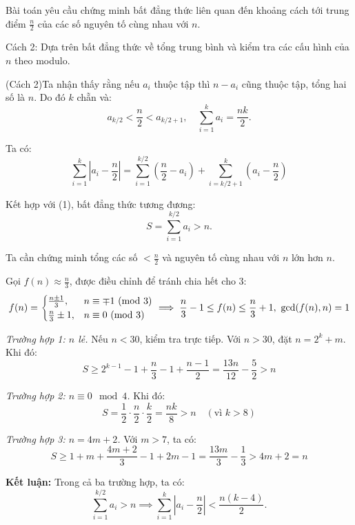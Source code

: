 \documentclass[../01-divisibility.tex]{subfiles}
\begin{document}
\newpage

\begin{story*}
	Bài toán yêu cầu chứng minh bất đẳng thức liên quan đến khoảng cách tới trung điểm \( \frac{n}{2} \) của các số nguyên tố cùng nhau với \( n \).
	
	Cách 2: Dựa trên bất đẳng thức về tổng trung bình và kiểm tra các cấu hình của \( n \) theo modulo.
\end{story*}

\begin{soln}(Cách 2)\footnotemark[\value{footnote}]
	Ta nhận thấy rằng nếu \( a_i \) thuộc tập thì \( n - a_i \) cũng thuộc tập, tổng hai số là \( n \). Do đó \( k \) chẵn và:
	\[
		a_{k/2} < \frac{n}{2} < a_{k/2+1}, \quad \sum_{i=1}^k a_i = \frac{nk}{2}. \tag{1}
	\]

	Ta có:
	\[
		\sum_{i=1}^{k} \left| a_i - \frac{n}{2} \right| = \sum_{i=1}^{k/2} \left(\frac{n}{2} - a_i\right) + \sum_{i=k/2+1}^{k} \left(a_i - \frac{n}{2}\right)
	\]

	Kết hợp với (1), bất đẳng thức tương đương:
	\[
		S = \sum_{i=1}^{k/2} a_i > n.
	\]

	Ta cần chứng minh tổng các số \( < \frac{n}{2} \) và nguyên tố cùng nhau với \( n \) lớn hơn \( n \).

	Gọi \( f(n) \approx \frac{n}{3} \), được điều chỉnh để tránh chia hết cho 3:
	\[
		f(n) = 
		\begin{cases}
			\frac{n \pm 1}{3}, & n \equiv \mp 1 \Mod{3} \\
			\frac{n}{3} \pm 1, & n \equiv 0 \Mod{3}
		\end{cases}
		\implies \frac{n}{3} - 1 \le f(n) \le \frac{n}{3} + 1,\ \gcd(f(n), n) = 1
	\]

	\textit{Trường hợp 1: \( n \) lẻ.} Nếu \( n < 30 \), kiểm tra trực tiếp. Với \( n > 30 \), đặt \( n = 2^k + m \). Khi đó:
	\[
		S \ge 2^{k-1} - 1 + \frac{n}{3} - 1 + \frac{n - 1}{2} = \frac{13n}{12} - \frac{5}{2} > n
	\]

	\textit{Trường hợp 2: \( n \equiv 0 \mod 4 \).} Khi đó:
	\[
		S = \frac{1}{2} \cdot \frac{n}{2} \cdot \frac{k}{2} = \frac{nk}{8} > n \quad (\text{vì } k > 8)
	\]

	\textit{Trường hợp 3: \( n = 4m + 2 \).} Với \( m > 7 \), ta có:
	\[
		S \ge 1 + m + \frac{4m + 2}{3} - 1 + 2m - 1 = \frac{13m}{3} - \frac{1}{3} > 4m + 2 = n
	\]

	\textbf{Kết luận:} Trong cả ba trường hợp, ta có:
	\[
		\sum_{i=1}^{k/2} a_i > n \implies \sum_{i=1}^k \left| a_i - \frac{n}{2} \right| < \frac{n(k - 4)}{2}.
	\]
\end{soln}

\end{document}
